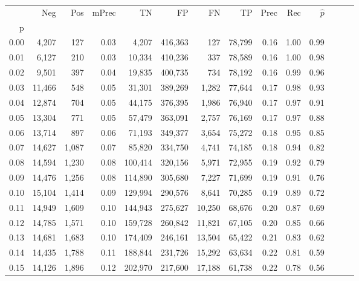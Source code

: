 \begin{tabular}{rrrrrrrrrrrrrr}
\toprule
{} &     Neg &    Pos & mPrec &       TN &       FP &      FN &      TP &  Prec &   Rec & $\hat{p}$ \\
p    &         &        &       &          &          &         &         &       &       &           \\
\midrule
0.00 &   4,207 &    127 &  0.03 &    4,207 &  416,363 &     127 &  78,799 &  0.16 &  1.00 &      0.99 \\
0.01 &   6,127 &    210 &  0.03 &   10,334 &  410,236 &     337 &  78,589 &  0.16 &  1.00 &      0.98 \\
0.02 &   9,501 &    397 &  0.04 &   19,835 &  400,735 &     734 &  78,192 &  0.16 &  0.99 &      0.96 \\
0.03 &  11,466 &    548 &  0.05 &   31,301 &  389,269 &   1,282 &  77,644 &  0.17 &  0.98 &      0.93 \\
0.04 &  12,874 &    704 &  0.05 &   44,175 &  376,395 &   1,986 &  76,940 &  0.17 &  0.97 &      0.91 \\
0.05 &  13,304 &    771 &  0.05 &   57,479 &  363,091 &   2,757 &  76,169 &  0.17 &  0.97 &      0.88 \\
0.06 &  13,714 &    897 &  0.06 &   71,193 &  349,377 &   3,654 &  75,272 &  0.18 &  0.95 &      0.85 \\
0.07 &  14,627 &  1,087 &  0.07 &   85,820 &  334,750 &   4,741 &  74,185 &  0.18 &  0.94 &      0.82 \\
0.08 &  14,594 &  1,230 &  0.08 &  100,414 &  320,156 &   5,971 &  72,955 &  0.19 &  0.92 &      0.79 \\
0.09 &  14,476 &  1,256 &  0.08 &  114,890 &  305,680 &   7,227 &  71,699 &  0.19 &  0.91 &      0.76 \\
0.10 &  15,104 &  1,414 &  0.09 &  129,994 &  290,576 &   8,641 &  70,285 &  0.19 &  0.89 &      0.72 \\
0.11 &  14,949 &  1,609 &  0.10 &  144,943 &  275,627 &  10,250 &  68,676 &  0.20 &  0.87 &      0.69 \\
0.12 &  14,785 &  1,571 &  0.10 &  159,728 &  260,842 &  11,821 &  67,105 &  0.20 &  0.85 &      0.66 \\
0.13 &  14,681 &  1,683 &  0.10 &  174,409 &  246,161 &  13,504 &  65,422 &  0.21 &  0.83 &      0.62 \\
0.14 &  14,435 &  1,788 &  0.11 &  188,844 &  231,726 &  15,292 &  63,634 &  0.22 &  0.81 &      0.59 \\
0.15 &  14,126 &  1,896 &  0.12 &  202,970 &  217,600 &  17,188 &  61,738 &  0.22 &  0.78 &      0.56 \\

\end{tabular}
